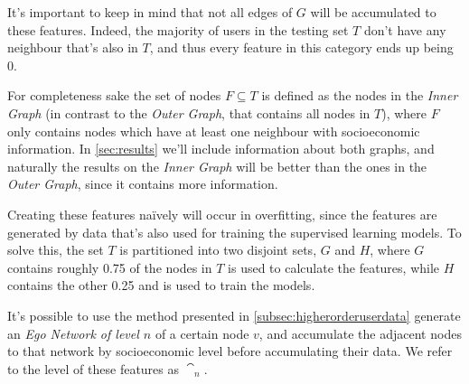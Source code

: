 It's important to keep in mind that not all edges of $G$ will be accumulated to these features. Indeed, the majority of users in the testing set $T$ don't have any neighbour that's also in $T$, and thus every feature in this category ends up being $0$.

For completeness sake the set of nodes $F \subseteq T$ is defined as the nodes in the \emph{Inner Graph} (in contrast to the \emph{Outer Graph}, that contains all nodes in $T$), where $F$ only contains nodes which have at least one neighbour with socioeconomic information. In \cref{sec:results} we'll include information about both graphs, and naturally the results on the \emph{Inner Graph} will be better than the ones in the \emph{Outer Graph}, since it contains more information.

Creating these features naïvely will occur in overfitting, since the features are generated by data that's also used for training the supervised learning models. To solve this, the set $T$ is partitioned into two disjoint sets, $G$ and $H$, where $G$ contains roughly 0.75 of the nodes in $T$ is used to calculate the features, while $H$ contains the other 0.25 and is used to train the models.

It's possible to use the method presented in \cref{subsec:higherorderuserdata} generate an \emph{Ego Network of level $n$} of a certain node $v$, and accumulate the adjacent nodes to that network by socioeconomic level before accumulating their data. We refer to the level of these features as $\cat_n$.
